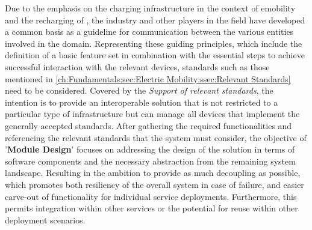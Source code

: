 Due to the emphasis on the charging infrastructure in the context of \acrshort{emobility} and the recharging of , the industry and other players in the field have developed a common basis as a guideline for communication between the various entities involved in the domain.
Representing these guiding principles, which include the definition of a basic feature set in combination with the essential steps to achieve successful interaction with the relevant devices, standards such as those mentioned in \ref{ch:Fundamentals:sec:Electric Mobility:ssec:Relevant Standards} need to be considered.
Covered by the \textit{Support of relevant standards}, the intention is to provide an interoperable solution that is not restricted to a particular type of infrastructure but can manage all devices that implement the generally accepted standards.
After gathering the required functionalities and referencing the relevant standards that the system must consider, the objective of '\textbf{Module Design}' focuses on addressing the design of the solution in terms of software components and the necessary abstraction from the remaining system landscape.
Resulting in the ambition to provide as much decoupling as possible, which promotes both resiliency of the overall system in case of failure, and easier carve-out of functionality for individual service deployments. Furthermore, this permits integration within other services or the potential for reuse within other deployment scenarios. \\

